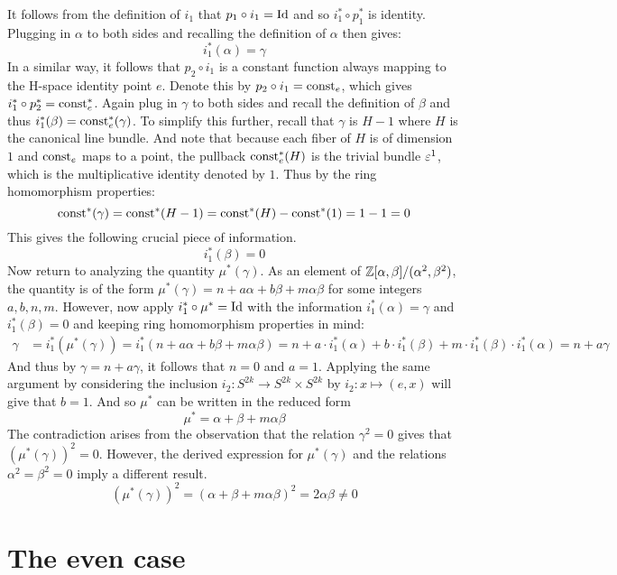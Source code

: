\documentclass[../sean_thesis.tex]{subfiles}
\begin{document}
It follows from the definition of $i_1$ that $p_1 \circ i_1 = \operatorname{Id}$ and so $i_1^{*} \circ p_1^{*}$ is identity. Plugging in $\alpha$ to both sides and recalling the definition of $\alpha$ then gives:
\begin{equation*}
	i_1^{*}(\alpha) = \gamma	
\end{equation*} 
%
In a similar way, it follows that $p_2 \circ i_1$ is a constant function always mapping to the H-space identity point $e$. Denote this by $p_2 \circ i_1 = \operatorname{const}_e$, which gives $i_1^{*} \circ p_2^{*} = \operatorname{const}_e^{*}$. Again plug in $\gamma$ to both sides and recall the definition of $\beta$ and thus $i_1^{*}(\beta) = \operatorname{const}_e^{*}(\gamma)$.  To simplify this further, recall that $\gamma$ is $H-1$ where $H$ is the canonical line bundle. And note that because each fiber of $H$ is of dimension $1$ and $\operatorname{const}_e$ maps to a point, the pullback $\operatorname{const}^{*}_e(H)$ is the trivial bundle $\varepsilon^{1}$, which is the multiplicative identity denoted by $1$. Thus by  the ring homomorphism properties:
\begin{equation*}
\operatorname{const}^{*}(\gamma) = \operatorname{const}^{*}(H-1) = \operatorname{const}^{*}(H)-\operatorname{const}^{*}(1) = 1-1=0
\end{equation*}
This gives the following crucial piece of information.
\begin{equation*}
	i_1^{*}(\beta) = 0
\end{equation*}
%
Now return to analyzing the quantity $\mu^{*}(\gamma)$. As an element of $\mathbb{Z}[\alpha, \beta]/(\alpha^{2}, \beta^{2})$, the quantity is of the form $\mu^{*}(\gamma) = n + a \alpha + b \beta + m \alpha \beta$ for some integers $a,b,n,m$. However, now apply $i_1^{*} \circ \mu^{*} = \operatorname{Id}$ with the information $i_1^{*}(\alpha) = \gamma$ and $i_1^{*}(\beta) = 0$ and keeping ring homomorphism properties in mind:
\begin{align*}
	\gamma 
	&= i_1^{*}(\mu^{*}(\gamma)) 
	= i_1^{*}(n+a\alpha+b\beta+m\alpha\beta) 
	= n+a\cdot i_1^{*}(\alpha)+b\cdot i_1^{*}(\beta)+m \cdot i_1^{*}(\beta) \cdot i_1^{*}(\alpha)
	= n + a\gamma
\end{align*}
And thus by $\gamma = n+a\gamma$, it follows that $n=0$ and $a=1$. Applying the same argument by considering the inclusion $i_2: S^{2k} \to S^{2k} \times S^{2k}$ by $i_2: x \mapsto (e,x)$ will give that $b=1$. And so $\mu^{*}$ can be written in the reduced form
\begin{equation*}
\mu^{*} = \alpha + \beta + m\alpha\beta
\end{equation*}
%
The contradiction arises from the observation that the relation $\gamma^2 = 0$ gives that $(\mu^{*}(\gamma))^2 = 0$. However, the derived expression for $\mu^{*}(\gamma)$ and the relations $\alpha^2 = \beta^2 = 0$ imply a different result.
\begin{equation*}
(\mu^{*}(\gamma))^2 = (\alpha + \beta + m\alpha\beta)^2 = 2\alpha\beta \neq 0
\end{equation*}
\section{The even case}
\end{document}
